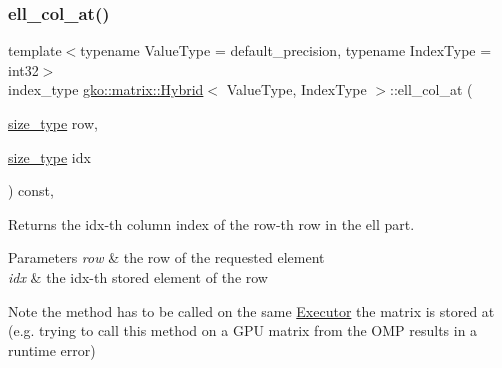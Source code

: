 \subsubsection{\texorpdfstring{ell\+\_\+col\+\_\+at()}{ell\_col\_at()}\hspace{0.1cm}{\footnotesize\ttfamily [2/2]}}
{\footnotesize\ttfamily template$<$typename Value\+Type = default\+\_\+precision, typename Index\+Type = int32$>$ \\
index\+\_\+type \hyperlink{classgko_1_1matrix_1_1Hybrid}{gko\+::matrix\+::\+Hybrid}$<$ Value\+Type, Index\+Type $>$\+::ell\+\_\+col\+\_\+at (\begin{DoxyParamCaption}\item[{\hyperlink{namespacegko_a6e5c95df0ae4e47aab2f604a22d98ee7}{size\+\_\+type}}]{row,  }\item[{\hyperlink{namespacegko_a6e5c95df0ae4e47aab2f604a22d98ee7}{size\+\_\+type}}]{idx }\end{DoxyParamCaption}) const\hspace{0.3cm}{\ttfamily [inline]}, {\ttfamily [noexcept]}}



Returns the {\ttfamily idx}-\/th column index of the {\ttfamily row}-\/th row in the ell part. 


\begin{DoxyParams}{Parameters}
{\em row} & the row of the requested element \\
\hline
{\em idx} & the idx-\/th stored element of the row\\
\hline
\end{DoxyParams}
\begin{DoxyNote}{Note}
the method has to be called on the same \hyperlink{classgko_1_1Executor}{Executor} the matrix is stored at (e.\+g. trying to call this method on a G\+PU matrix from the O\+MP results in a runtime error) 
\end{DoxyNote}
\mbox{\label{classgko_1_1matrix_1_1Hybrid_a5a0b57a9285424720218ff03dad6846c}} 
